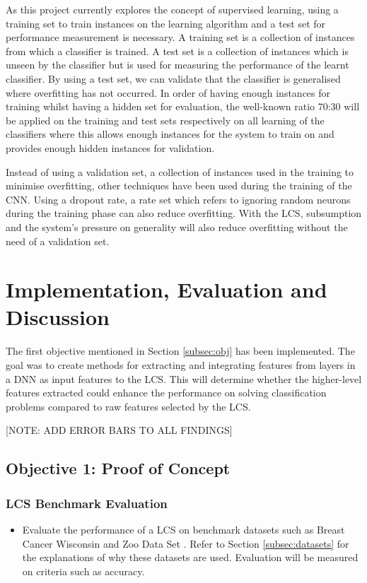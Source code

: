 As this project currently explores the concept of supervised learning, using a training set to train instances on the learning algorithm and a test set for performance measurement is necessary. A training set is a collection of instances from which a classifier is trained. A test set is a collection of instances which is unseen by the classifier but is used for measuring the performance of the learnt classifier. By using a test set, we can validate that the classifier is generalised where overfitting has not occurred. In order of having enough instances for training whilst having a hidden set for evaluation, the well-known ratio 70:30 will be applied on the training and test sets respectively on all learning of the classifiers where this allows enough instances for the system to train on and provides enough hidden instances for validation.

Instead of using a validation set, a collection of instances used in the training to minimise overfitting, other techniques have been used during the training of the CNN. Using a dropout rate, a rate set which refers to ignoring random neurons during the training phase can also reduce overfitting. With the LCS, subsumption and the system’s pressure on generality will also reduce overfitting without the need of a validation set.

\chapter{Implementation, Evaluation and Discussion}
The first objective mentioned in Section \ref{subsec:obj} has been implemented. The goal was to create methods for extracting and integrating features from layers in a DNN as input features to the LCS. This will determine whether the higher-level features extracted could enhance the performance on solving classification problems compared to raw features selected by the LCS. 

[NOTE: ADD ERROR BARS TO ALL FINDINGS]
\section{Objective 1: Proof of Concept}
\subsection{LCS Benchmark Evaluation} \label{subsec:bench}
\begin{itemize}
	\item Evaluate the performance of a LCS on benchmark datasets such as Breast Cancer Wisconsin \cite{wisconsinbreast} and Zoo Data Set \cite{zoodata}. Refer to Section \ref{subsec:datasets} for the explanations of why these datasets are used. Evaluation will be measured on criteria such as accuracy.

\end{itemize}

